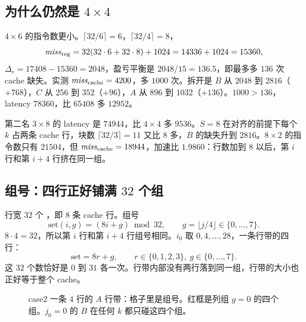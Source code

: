 \subsection{为什么仍然是 \texorpdfstring{$4\times4$}{4x4}}

$4\times6$ 的指令数更小。$\lceil32/6\rceil=6$，$\lceil32/4\rceil=8$，
\[
\mathit{miss}_{\mathrm{reg}}=32(32\cdot6+32\cdot8)+1024=14336+1024=15360,
\]
$\Delta_r=17408-15360=2048$，盈亏平衡是 $2048/15=136.5$，即最多多 $136$ 次 cache 缺失。实测 $\mathit{miss}_{\mathrm{cache}}=4200$，多 $1000$ 次。拆开是 $B$ 从 $2048$ 到 $2816$（$+768$），$C$ 从 $256$ 到 $352$（$+96$），$A$ 从 $896$ 到 $1032$（$+136$）。$1000>136$，latency $78360$，比 $65408$ 多 $12952$。

第二名 $3\times8$ 的 latency 是 $74944$，比 $4\times4$ 多 $9536$。$S=8$ 在对齐的前提下每个 $k$ 占两条 cache 行，块数 $\lceil32/3\rceil=11$ 又比 $8$ 多，$B$ 的缺失升到 $2816$。$8\times2$ 的指令数只有 $21504$，但 $\mathit{miss}_{\mathrm{cache}}=18944$，加速比 $1.9860$：行数加到 $8$ 以后，第 $i$ 行和第 $i+4$ 行挤在同一组。

\subsection{组号：四行正好铺满 \texorpdfstring{$32$}{32} 个组}
\label{sec:c2map}

行宽 $32$ 个 ，即 $8$ 条 cache 行。组号
\begin{equation}
\label{eq:c2set}
\mathrm{set}(i,g)=(8i+g)\bmod 32,\qquad g=\lfloor j/4\rfloor\in\{0,\ldots,7\}.
\end{equation}
$8\cdot4=32$，所以第 $i$ 行和第 $i+4$ 行组号相同。$i_0$ 取 $0,4,\ldots,28$，一条行带的四行：
\[
\mathrm{set}=8r+g,\qquad r\in\{0,1,2,3\},\ g\in\{0,\ldots,7\}.
\]
这 $32$ 个数恰好是 $0$ 到 $31$ 各一次。行带内部没有两行落到同一组，行带的大小也正好等于整个 cache。

\begin{figure}[ht]
\centering
{}
\caption{case2 一条 $4$ 行的 $A$ 行带：格子里是组号。红框是列组 $g=0$ 的四个组。$j_0=0$ 的 $B$ 在任何 $k$ 都只碰这四个组。}
\label{fig:c2set}
\end{figure}

